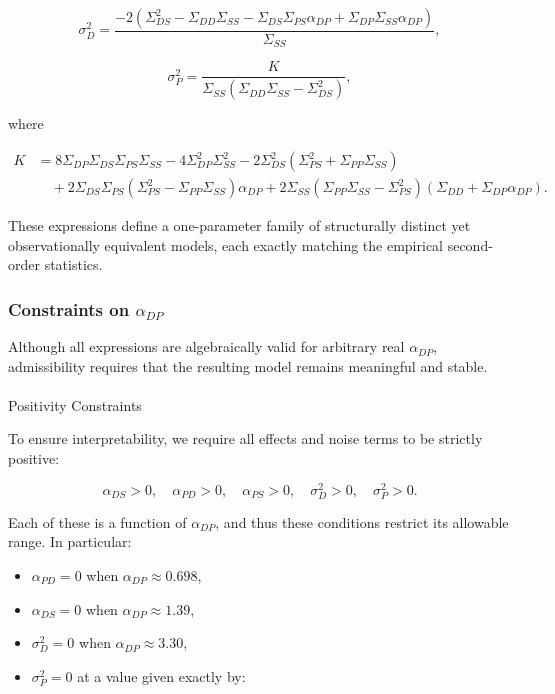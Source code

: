 \documentclass[
]{article}
\makeatletter
\let\oldparagraph\paragraph
\renewcommand{\paragraph}{
    \@ifstar
      \xxxParagraphStar
      \xxxParagraphNoStar
  }
\newcommand{\xxxParagraphStar}[1]{\oldparagraph*{#1}\mbox{}}
\newcommand{\xxxParagraphNoStar}[1]{\oldparagraph{#1}\mbox{}}
\providecommand{\tightlist}{%
  \setlength{\itemsep}{0pt}\setlength{\parskip}{0pt}}\usepackage{longtable,booktabs,array}
\makeatother
\begin{document}
\[
\sigma_D^2 = \frac{-2 \left(\Sigma_{DS}^2 - \Sigma_{DD} \Sigma_{SS} - \Sigma_{DS} \Sigma_{PS} \alpha_{DP} + \Sigma_{DP} \Sigma_{SS} \alpha_{DP} \right)}{\Sigma_{SS}},
\]

\[
\sigma_P^2 = \frac{K}{\Sigma_{SS} (\Sigma_{DD} \Sigma_{SS} - \Sigma_{DS}^2)},
\]

where

\[
\begin{aligned}
K &= 8 \Sigma_{DP} \Sigma_{DS} \Sigma_{PS} \Sigma_{SS}
- 4 \Sigma_{DP}^2 \Sigma_{SS}^2
- 2 \Sigma_{DS}^2 (\Sigma_{PS}^2 + \Sigma_{PP} \Sigma_{SS}) \\
&\quad + 2 \Sigma_{DS} \Sigma_{PS} (\Sigma_{PS}^2 - \Sigma_{PP} \Sigma_{SS}) \alpha_{DP}
+ 2 \Sigma_{SS} (\Sigma_{PP} \Sigma_{SS} - \Sigma_{PS}^2)(\Sigma_{DD} + \Sigma_{DP} \alpha_{DP}).
\end{aligned}
\]

These expressions define a one-parameter family of structurally distinct
yet observationally equivalent models, each exactly matching the
empirical second-order statistics.

\subsubsection{\texorpdfstring{Constraints on
\(\alpha_{DP}\)}{Constraints on \textbackslash alpha\_\{DP\}}}\label{constraints-on-alpha_dp}

Although all expressions are algebraically valid for arbitrary real
\(\alpha_{DP}\), admissibility requires that the resulting model remains
meaningful and stable.

\paragraph{Positivity Constraints}\label{positivity-constraints}

To ensure interpretability, we require all effects and noise terms to be
strictly positive:

\[
\alpha_{DS} > 0, \quad \alpha_{PD} > 0, \quad \alpha_{PS} > 0, \quad \sigma_D^2 > 0, \quad \sigma_P^2 > 0.
\]

Each of these is a function of \(\alpha_{DP}\), and thus these
conditions restrict its allowable range. In particular:

\begin{itemize}
\tightlist
\item
  \(\alpha_{PD} = 0\) when \(\alpha_{DP} \approx 0.698\),
\item
  \(\alpha_{DS} = 0\) when \(\alpha_{DP} \approx 1.39\),
\item
  \(\sigma_D^2 = 0\) when \(\alpha_{DP} \approx 3.30\),
\item
  \(\sigma_P^2 = 0\) at a value given exactly by:
\end{itemize}
\end{document}
